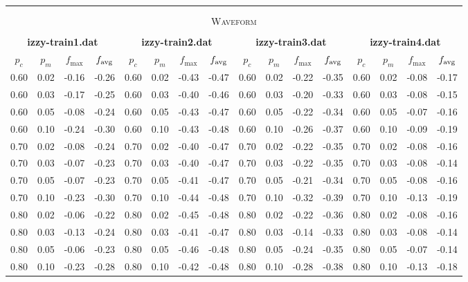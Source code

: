 {\begin{tabular}{c|c|c|c||c|c|c|c||c|c|c|c||c|c|c|c}
\multicolumn{16}{c}{ } \\\multicolumn{16}{c}{ } \\
\multicolumn{16}{c}{ \normalsize \textsc{Waveform}} \\ 
\multicolumn{16}{c}{ } \\
\multicolumn{4}{c}{ \textbf{izzy-train1.dat}} &    \multicolumn{4}{c}{ \textbf{izzy-train2.dat}} &    \multicolumn{4}{c}{ \textbf{izzy-train3.dat}} &    \multicolumn{4}{c}{ \textbf{izzy-train4.dat}} \\ \hline
$p_c$ & $p_m$ & $f_{\max}$ & $f_{\operatorname{avg}}$  &    $p_c$ & $p_m$ & $f_{\max}$ & $f_{\operatorname{avg}}$  &    $p_c$ & $p_m$ & $f_{\max}$ & $f_{\operatorname{avg}}$  &    $p_c$ & $p_m$ & $f_{\max}$ & $f_{\operatorname{avg}}$  \\ \hline\hline
0.60 & 0.02 & -0.16 & -0.26 &    0.60 & 0.02 & -0.43 & -0.47 &    0.60 & 0.02 & -0.22 & -0.35 &    0.60 & 0.02 & -0.08 & -0.17 \\ \hline
0.60 & 0.03 & -0.17 & -0.25 &    0.60 & 0.03 & -0.40 & {\cellcolor{yellow}-0.46} &    0.60 & 0.03 & -0.20 & -0.33 &    0.60 & 0.03 & -0.08 & -0.15 \\ \hline
0.60 & 0.05 & -0.08 & -0.24 &    0.60 & 0.05 & -0.43 & -0.47 &    0.60 & 0.05 & -0.22 & -0.34 &    0.60 & 0.05 & -0.07 & -0.16 \\ \hline
0.60 & 0.10 & -0.24 & -0.30 &    0.60 & 0.10 & -0.43 & -0.48 &    0.60 & 0.10 & -0.26 & -0.37 &    0.60 & 0.10 & -0.09 & -0.19 \\ \hline\hline
0.70 & 0.02 & -0.08 & -0.24 &    0.70 & 0.02 & -0.40 & -0.47 &    0.70 & 0.02 & -0.22 & -0.35 &    0.70 & 0.02 & -0.08 & -0.16 \\ \hline
0.70 & 0.03 & -0.07 & -0.23 &    0.70 & 0.03 & {\cellcolor{green}-0.40} & -0.47 &    0.70 & 0.03 & -0.22 & -0.35 &    0.70 & 0.03 & -0.08 & {\cellcolor{yellow}-0.14} \\ \hline
0.70 & 0.05 & -0.07 & -0.23 &    0.70 & 0.05 & -0.41 & -0.47 &    0.70 & 0.05 & -0.21 & -0.34 &    0.70 & 0.05 & -0.08 & -0.16 \\ \hline
0.70 & 0.10 & -0.23 & -0.30 &    0.70 & 0.10 & -0.44 & -0.48 &    0.70 & 0.10 & -0.32 & -0.39 &    0.70 & 0.10 & -0.13 & -0.19 \\ \hline\hline
0.80 & 0.02 & -0.06 & {\cellcolor{yellow}-0.22} &    0.80 & 0.02 & -0.45 & -0.48 &    0.80 & 0.02 & -0.22 & -0.36 &    0.80 & 0.02 & -0.08 & -0.16 \\ \hline
0.80 & 0.03 & -0.13 & -0.24 &    0.80 & 0.03 & -0.41 & -0.47 &    0.80 & 0.03 & {\cellcolor{green}-0.14} & {\cellcolor{yellow}-0.33} &    0.80 & 0.03 & -0.08 & -0.14 \\ \hline
0.80 & 0.05 & {\cellcolor{green}-0.06} & -0.23 &    0.80 & 0.05 & -0.46 & -0.48 &    0.80 & 0.05 & -0.24 & -0.35 &    0.80 & 0.05 & {\cellcolor{green}-0.07} & -0.14 \\ \hline
0.80 & 0.10 & -0.23 & -0.28 &    0.80 & 0.10 & -0.42 & -0.48 &    0.80 & 0.10 & -0.28 & -0.38 &    0.80 & 0.10 & -0.13 & -0.18 \\ \hline\hline

\end{tabular}
}
